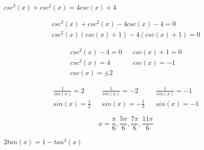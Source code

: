 \documentclass[10pt,letterpaper]{amspset}
\begin{document}
\begin{problem}[40]
    $csc^3(x) + csc^2(x) = 4csc(x) + 4$
\end{problem}

\begin{solution}
    \begin{align}
        csc^3(x) + csc^2(x) - 4csc(x) - 4 = 0 \\
        csc^2(x)(csc(x) + 1) - 4(csc(x) + 1) = 0
    \end{align}
    
    \begin{align}
        csc^2(x) - 4 = 0 && csc(x) + 1 = 0 \\
        csc^2(x) = 4 && csc(x) = - 1 \\
        csc(x) = \pm 2
    \end{align}
    
    \begin{align}
        \frac{1}{sin(x)} = 2 && \frac{1}{sin(x)} = -2 && \frac{1}{sin(x)} = -1 \\
        sin(x) = \frac{1}{2} && sin(x) = -\frac{1}{2} && sin(x) = -1 
    \end{align}
    
    \[\boxed{x = \frac{\pi}{6}, \frac{5\pi}{6}, \frac{7\pi}{6}, \frac{11\pi}{6}   }\]
\end{solution}


\pagebreak


\begin{problem}[41]
    $2tan(x) = 1 - tan^2(x)$
\end{problem}
\end{document}
